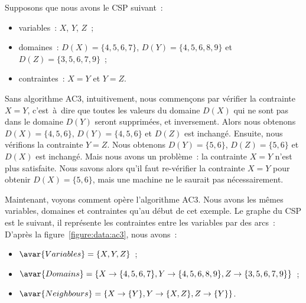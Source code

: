 \begin{example}
\label{example:data:ac3}

Supposons que nous avons le CSP suivant~:
%
\begin{itemize}

\item variables~: $X$, $Y$, $Z$~;

\item domaines~: $D(X) = \{4, 5, 6, 7\}$, $D(Y) = \{4, 5, 6, 8, 9\}$ et $D(Z) =
\{3, 5, 6, 7, 9\}$~;

\item contraintes~: $X = Y$ et $Y = Z$.

\end{itemize}

Sans algorithme AC3, intuitivement, nous commençons par vérifier la contrainte
$X = Y$, c'est~à~dire que toutes les valeurs du domaine $D(X)$ qui ne sont pas
dans le domaine $D(Y)$ seront supprimées, et inversement. Alors nous obtenons
$D(X) = \{4, 5, 6\}$, $D(Y) = \{4, 5, 6\}$ et $D(Z)$ est inchangé. Ensuite, nous
vérifions la contrainte $Y = Z$. Nous obtenons $D(Y) = \{5, 6\}$, $D(Z) = \{5,
6\}$ et $D(X)$ est inchangé. Mais nous avons un problème~: la contrainte $X = Y$
n'est plus satisfaite. Nous savons alors qu'il faut re-vérifier la contrainte $X
= Y$ pour obtenir $D(X) = \{5, 6\}$, mais une machine ne le saurait pas
nécessairement.

Maintenant, voyons comment opère l'algorithme AC3. Nous avons les mêmes
variables, domaines et contraintes qu'au début de cet exemple. Le graphe du CSP
est le suivant, il représente les contraintes entre les variables par des arcs~:
%
%
D'après la figure~\ref{figure:data:ac3}, nous avons~:
%
\begin{itemize}

\item $\avar{Variables} = \{X, Y, Z\}$~;

\item $\avar{Domains} = \{X \rightarrow \{4, 5, 6, 7\}, Y \rightarrow \{4, 5, 6,
8, 9\}, Z \rightarrow \{3, 5, 6, 7, 9\}\}$~;

\item $\avar{Neighbours} = \{X \rightarrow \{Y\}, Y \rightarrow \{X, Z\}, Z \rightarrow \{Y\}\}$.


\end{itemize}
\end{example}
